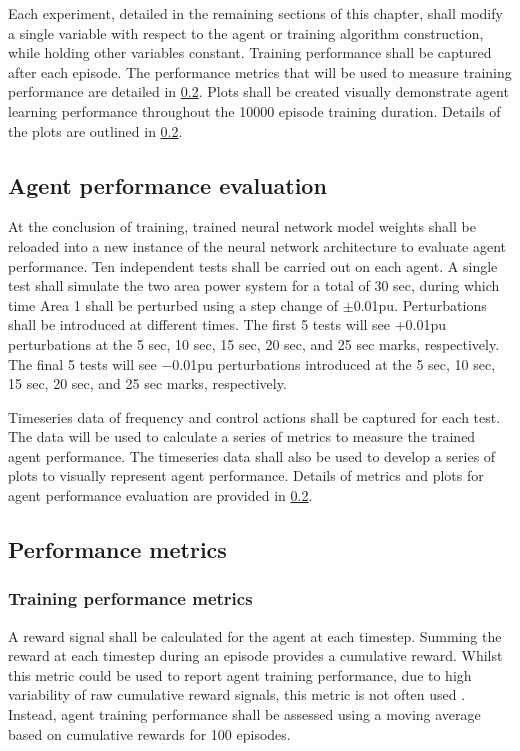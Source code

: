 \newpage

Each experiment, detailed in the remaining sections of this chapter, shall modify a single variable with respect to the agent or training algorithm construction, while holding other variables constant. Training performance shall be captured after each episode. The performance metrics that will be used to measure training performance are detailed in \textsection \ref{sec:agent_performance}. Plots shall be created visually demonstrate agent learning performance throughout the 10000 episode training duration. Details of the plots are outlined in \textsection \ref{sec:agent_performance}.

\subsection{Agent performance evaluation}\label{ssec:testing}
At the conclusion of training, trained neural network model weights shall be reloaded into a new instance of the neural network architecture to evaluate agent performance. Ten independent tests shall be carried out on each agent. A single test shall simulate the two area power system for a total of 30 sec, during which time Area 1 shall be perturbed using a step change of $\pm$0.01pu. Perturbations shall be introduced at different times. The first 5 tests will see +0.01pu perturbations at the 5 sec, 10 sec, 15 sec, 20 sec, and 25 sec marks, respectively. The final 5 tests will see $-$0.01pu perturbations introduced at the 5 sec, 10 sec, 15 sec, 20 sec, and 25 sec marks, respectively.

Timeseries data of frequency and control actions shall be captured for each test. The data will be used to calculate a series of metrics to measure the trained agent performance. The timeseries data shall also be used to develop a series of plots to visually represent agent performance. Details of metrics and plots for agent performance evaluation are provided in \ref{sec:agent_performance}.


\subsection{Performance metrics}\label{sec:agent_performance}
\subsubsection{Training performance metrics}
A reward signal shall be calculated for the agent at each timestep. Summing the reward at each timestep during an episode provides a cumulative reward. Whilst  this metric could be used to report agent training performance, due to high variability of raw cumulative reward signals, this metric is not often used \cite{Henderson2017}. Instead, agent training performance shall be assessed using a moving average based on cumulative rewards for 100 episodes.

